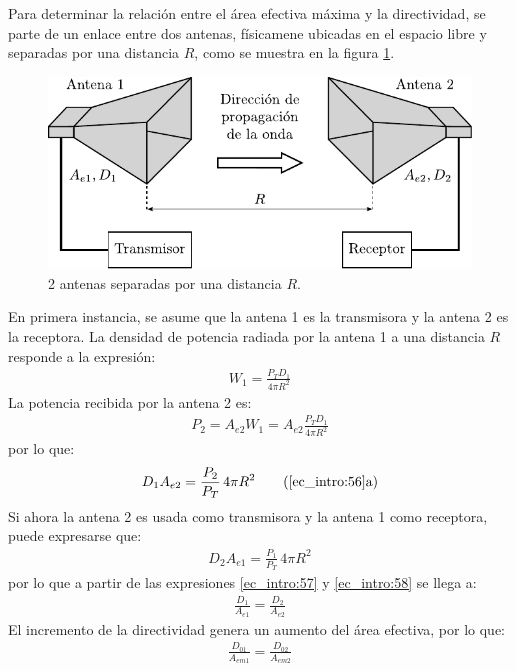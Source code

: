 Para determinar la relación entre el área efectiva máxima y la directividad, se parte de un enlace entre dos antenas, físicamene ubicadas en el espacio libre y separadas por una distancia $R$, como se muestra en la figura \ref{fig_intro:7}.
\begin{figure} [H]
\centering 
\includegraphics[scale = 1]{Figures/Intro/intro_7.pdf}
\caption{2 antenas separadas por una distancia $R$.}
\label{fig_intro:7}
\end{figure}
En primera instancia, se asume que la antena 1 es la transmisora y la antena 2 es la receptora. La densidad de potencia radiada por la antena 1 a una distancia $R$ responde a la expresión:
\begin{align}
W_1 = \frac{P_TD_1}{4\pi R^2}
\label{ec_intro:55}
\end{align}
La potencia recibida por la antena 2 es:
\begin{align}
P_2 = A_{e2}W_1 = A_{e2}\frac{P_TD_1}{4\pi R^2}
\label{ec_intro:56}
\end{align}
por lo que:
\begin{align}
D_1A_{e2} = \frac{P_2}{P_T}\,4\pi R^2
\tag{\ref{ec_intro:56}a}
\label{ec_intro:57}
\end{align}
Si ahora la antena 2 es usada como transmisora y la antena 1 como receptora, puede expresarse que:
\begin{align}
D_2A_{e1} = \frac{P_1}{P_T}\,4\pi R^2
\label{ec_intro:58}
\end{align}
por lo que a partir de las expresiones \eqref{ec_intro:57} y \eqref{ec_intro:58} se llega a:
\begin{align}
\frac{D_1}{A_{e1}} = \frac{D_2}{A_{e2}}
\label{ec_intro:59}
\end{align}
El incremento de la directividad genera un aumento del área efectiva, por lo que:
\begin{align}
\frac{D_{01}}{A_{em1}} = \frac{D_{02}}{A_{em2}}
\label{ec_intro:60}
\end{align}
